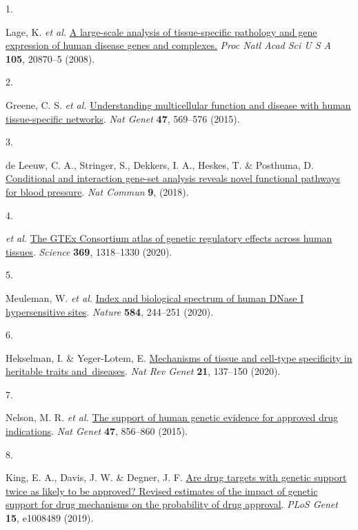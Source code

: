\documentclass[
  a4paper,
]{article}
\newlength{\cslhangindent}
\newlength{\csllabelwidth}
\newlength{\cslentryspacingunit} %
\newenvironment{CSLReferences}[2] %
 {%
  \setlength{\parindent}{0pt}
  \ifodd #1
  \let\oldpar\par
  \def\par{\hangindent=\cslhangindent\oldpar}
  \fi
  \setlength{\parskip}{#2\cslentryspacingunit}
 }%
 {}
\newcommand{\CSLLeftMargin}[1]{\parbox[t]{\csllabelwidth}{#1}}
\newcommand{\CSLRightInline}[1]{\parbox[t]{\linewidth - \csllabelwidth}{#1}\break}
\begin{document}
\hypertarget{refs}{}
\begin{CSLReferences}{0}{0}
\leavevmode{}%
\CSLLeftMargin{1. }%
\CSLRightInline{Lage, K. \emph{et al.} \href{https://doi.org/10.1073/pnas.0810772105}{A large-scale analysis of tissue-specific pathology and gene expression of human disease genes and complexes.} \emph{Proc Natl Acad Sci U S A} \textbf{105}, 20870--5 (2008).}

\leavevmode{}%
\CSLLeftMargin{2. }%
\CSLRightInline{Greene, C. S. \emph{et al.} \href{https://doi.org/10.1038/ng.3259}{Understanding multicellular function and disease with human tissue-specific networks}. \emph{Nat Genet} \textbf{47}, 569--576 (2015).}

\leavevmode{}%
\CSLLeftMargin{3. }%
\CSLRightInline{de Leeuw, C. A., Stringer, S., Dekkers, I. A., Heskes, T. \& Posthuma, D. \href{https://doi.org/10.1038/s41467-018-06022-6}{Conditional and interaction gene-set analysis reveals novel functional pathways for blood pressure}. \emph{Nat Commun} \textbf{9}, (2018).}

\leavevmode{}%
\CSLLeftMargin{4. }%
\CSLRightInline{\emph{et al.} \href{https://doi.org/10.1126/science.aaz1776}{The GTEx Consortium atlas of genetic regulatory effects across human tissues}. \emph{Science} \textbf{369}, 1318--1330 (2020).}

\leavevmode{}%
\CSLLeftMargin{5. }%
\CSLRightInline{Meuleman, W. \emph{et al.} \href{https://doi.org/10.1038/s41586-020-2559-3}{Index and biological spectrum of human DNase I hypersensitive sites}. \emph{Nature} \textbf{584}, 244--251 (2020).}

\leavevmode{}%
\CSLLeftMargin{6. }%
\CSLRightInline{Hekselman, I. \& Yeger-Lotem, E. \href{https://doi.org/10.1038/s41576-019-0200-9}{Mechanisms of tissue and cell-type specificity in heritable traits and~diseases}. \emph{Nat Rev Genet} \textbf{21}, 137--150 (2020).}

\leavevmode{}%
\CSLLeftMargin{7. }%
\CSLRightInline{Nelson, M. R. \emph{et al.} \href{https://doi.org/10.1038/ng.3314}{The support of human genetic evidence for approved drug indications}. \emph{Nat Genet} \textbf{47}, 856--860 (2015).}

\leavevmode{}%
\CSLLeftMargin{8. }%
\CSLRightInline{King, E. A., Davis, J. W. \& Degner, J. F. \href{https://doi.org/10.1371/journal.pgen.1008489}{Are drug targets with genetic support twice as likely to be approved? Revised estimates of the impact of genetic support for drug mechanisms on the probability of drug approval}. \emph{PLoS Genet} \textbf{15}, e1008489 (2019).}


\end{CSLReferences}
\end{document}
